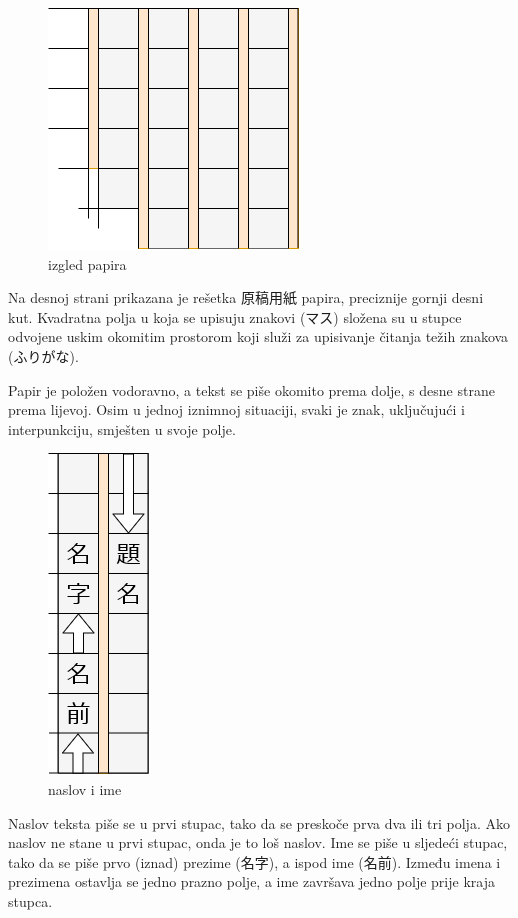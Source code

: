 
\author{Tomislav Mamić}


	
		
	\begin{figure}
		\centering
		\includegraphics[width=.25\textwidth]{017_pisanje_res/a1.png}
		\caption{izgled papira}
	\end{figure}

	Na desnoj strani prikazana je rešetka 原稿用紙 papira, preciznije gornji desni kut. Kvadratna polja u koja se upisuju znakovi (マス) složena su u stupce odvojene uskim okomitim prostorom koji služi za upisivanje čitanja težih znakova (ふりがな).
	
	Papir je položen vodoravno, a tekst se piše okomito prema dolje, s desne strane prema lijevoj. Osim u jednoj iznimnoj situaciji, svaki je znak, uključujući i interpunkciju, smješten u svoje polje.
	
	
	\begin{figure}
		\centering
		\includegraphics[width=.1\textwidth]{017_pisanje_res/a2.png}
		\caption{naslov i ime}
	\end{figure}

	Naslov teksta piše se u prvi stupac, tako da se preskoče prva dva ili tri polja. Ako naslov ne stane u prvi stupac, onda je to loš naslov. Ime se piše u sljedeći stupac, tako da se piše prvo (iznad) prezime (名字), a ispod ime (名前). Između imena i prezimena ostavlja se jedno prazno polje, a ime završava jedno polje prije kraja stupca.
	
